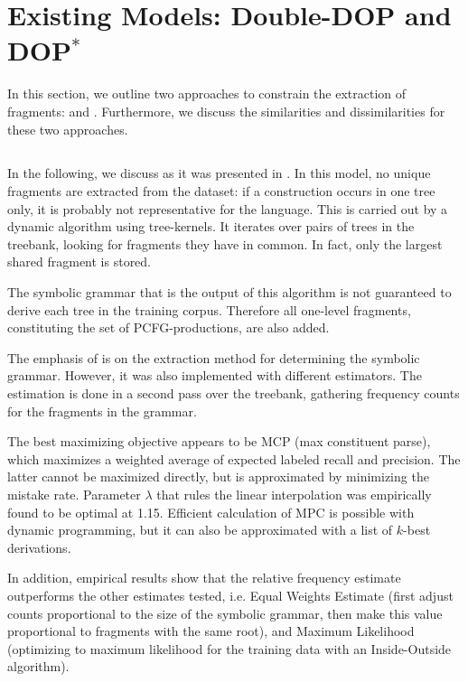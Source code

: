 
\section{Existing Models: Double-DOP and DOP$^*$}\label{sec:Existing}


In this section, we outline two approaches to constrain the extraction of fragments: \ddop{} and \dops{}. Furthermore, we discuss the similarities and dissimilarities for these two approaches. 

\subsection{\ddop}
In the following, we discuss \ddop{} as it was presented in \cite{sangati2011}. In this model, no unique fragments are extracted from the dataset: if a construction occurs in one tree only, it is probably not representative for the language. This is carried out by a dynamic algorithm using tree-kernels. It iterates over pairs of trees in the treebank, looking for fragments they have in common. In fact, only the largest shared fragment is stored. 

The symbolic grammar that is the output of this algorithm is not guaranteed to derive each tree in the training corpus. Therefore all one-level fragments, constituting the set of PCFG-productions, are also added.

The emphasis of \ddop{} is on the extraction method for determining the symbolic grammar. However, it was also implemented with different estimators. The estimation is done in a second pass over the treebank, gathering frequency counts for the fragments in the grammar. 

The best maximizing objective appears to be MCP (max constituent parse), which maximizes a weighted average of expected labeled recall and precision. The latter cannot be maximized directly, but is approximated by minimizing the mistake rate. 
Parameter $\lambda$ that rules the linear interpolation was empirically found to be optimal at 1.15. Efficient calculation of MPC is possible with dynamic programming, but it can also be approximated with a list of $k$-best derivations.

In addition, empirical results show that the relative frequency estimate outperforms the other estimates tested, i.e. Equal Weights Estimate (first adjust counts proportional to the size of the symbolic grammar, then make this value proportional to fragments with the same root), and Maximum Likelihood (optimizing to maximum likelihood for the training data with an Inside-Outside algorithm). 


